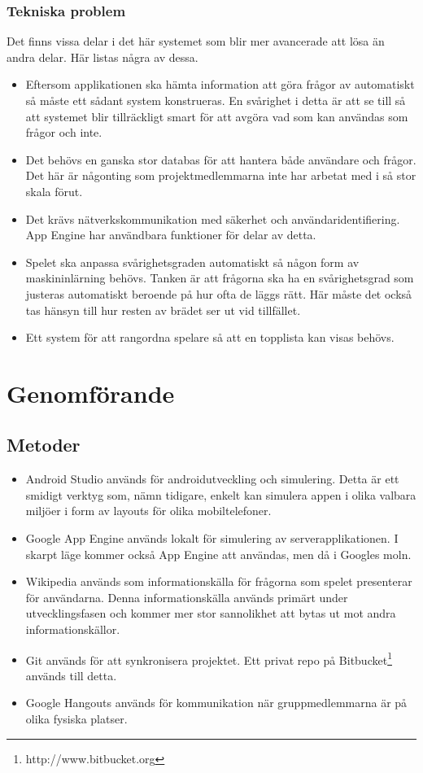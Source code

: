 \documentclass[swedish,12pt,a4paper]{article}
\begin{document}
\subsubsection{Tekniska problem}
Det finns vissa delar i det här systemet som blir mer avancerade att lösa än andra delar. Här listas några av dessa.
\begin{itemize}
\item Eftersom applikationen ska hämta information att göra frågor av automatiskt så måste ett sådant system konstrueras. En svårighet i detta är att se till så att systemet blir tillräckligt smart för att avgöra vad som kan användas som frågor och inte.
\item Det behövs en ganska stor databas för att hantera både användare och frågor. Det här är någonting som projektmedlemmarna inte har arbetat med i så stor skala förut.
\item Det krävs nätverkskommunikation med säkerhet och användaridentifiering. App Engine har användbara funktioner för delar av detta.
\item Spelet ska anpassa svårighetsgraden automatiskt så någon form av maskininlärning behövs. Tanken är att frågorna ska ha en svårighetsgrad som justeras automatiskt beroende på hur ofta de läggs rätt. Här måste det också tas hänsyn till hur resten av brädet ser ut vid tillfället.
\item Ett system för att rangordna spelare så att en topplista kan visas behövs.
\end{itemize}

\section{Genomförande}

\subsection{Metoder}
\begin{itemize}
\item Android Studio används för androidutveckling och simulering. Detta är ett smidigt verktyg som, nämn tidigare, enkelt kan simulera appen i olika valbara miljöer i form av layouts för olika mobiltelefoner. 
\item Google App Engine används lokalt för simulering av serverapplikationen. I skarpt läge kommer också App Engine att användas, men då i Googles moln.
\item Wikipedia används som informationskälla för frågorna som spelet presenterar för användarna. Denna informationskälla används primärt under utvecklingsfasen och kommer mer stor sannolikhet att bytas ut mot andra informationskällor.
\item Git används för att synkronisera projektet. Ett privat repo på Bitbucket\footnote{http://www.bitbucket.org} används till detta.
\item Google Hangouts används för kommunikation när gruppmedlemmarna är på olika fysiska platser.
\end{itemize}
\end{document}
